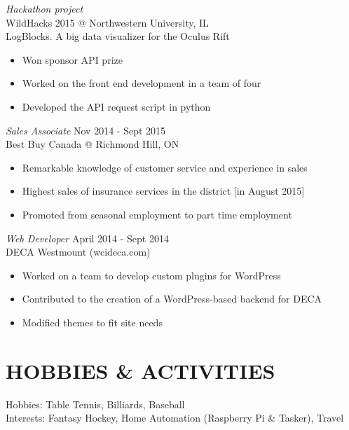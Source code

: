 \documentclass[article]{res}
\begin{document}
\begin{resume}
                {\sl Hackathon project} \\
                WildHacks 2015 @ Northwestern University, IL \\
				LogBlocks. A big data visualizer for the Oculus Rift 
				\begin {itemize} \itemsep -2pt
				\item Won sponsor API prize
				\item Worked on the front end development in a team of four
				\item Developed the API request script in python
				
				\end {itemize}

 
                {\sl Sales Associate} \hfill            Nov 2014 - Sept 2015 \\
                Best Buy Canada @ Richmond Hill, ON
                 \begin{itemize}  \itemsep -2pt %
                 \item Remarkable knowledge of customer service and experience in sales
                 \item Highest sales of insurance services in the district [in August 2015]
                 \item Promoted from seasonal employment to part time employment
                 \end{itemize} 
                {\sl Web Developer} \hfill        April 2014 - Sept 2014 \\
                DECA Westmount (wcideca.com)
                  \begin{itemize} \itemsep -2pt
                   \item Worked on a team to develop custom plugins for WordPress
                   \item Contributed to the creation of a WordPress-based backend for DECA
                   \item Modified themes to fit site needs 
                   \end{itemize} 
                  


\section{HOBBIES \&  ACTIVITIES}             
 			Hobbies: Table Tennis, Billiards, Baseball \\
			Interests: Fantasy Hockey, Home Automation (Raspberry Pi \& Tasker), Travel 			
\end{resume}
\end{document}

